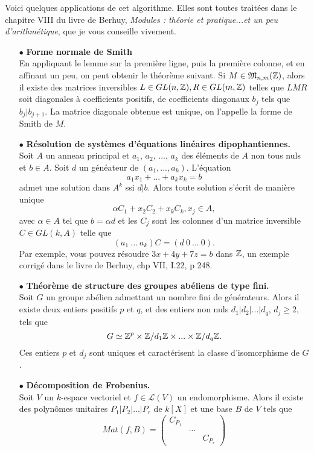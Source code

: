 Voici quelques applications de cet algorithme. Elles sont toutes traitées dans le chapitre VIII du livre de Berhuy, \textit{Modules : théorie et pratique...et un peu d'arithmétique}, que je vous conseille vivement.\\
\begin{itemize}
\item[$\bullet$] \textbf{Forme normale de Smith} \\ En appliquant le lemme sur la première ligne, puis la première colonne, et en affinant un peu, on peut obtenir le théorème suivant. Si $M\in \mathfrak M_{n,m}(\mathbb Z)$, alors il existe des matrices inversibles $L\in GL(n,\mathbb Z), R\in GL(m,\mathbb Z)$ telles que $LMR$ soit diagonales à coefficients positifs, de coefficients diagonaux $b_j$ tels que $b_j|b_{j+1}$. La matrice diagonale obtenue est unique, on l'appelle la forme de Smith de $M$.
\item[$\bullet$]\textbf{ Résolution de systèmes d'équations linéaires dipophantiennes.}\\ Soit $A$ un anneau principal et $a_1$, $a_2$, ..., $a_k$ des éléments de $A$ non tous nuls et $b\in A$. Soit $d$ un généateur de $(a_1,...,a_k)$. L'équation 
\[a_1 x_1 +...+a_k x_k = b\]
admet une solution dans $A^k$ ssi $d|b$. Alors toute solution s'écrit de manière unique
\[\alpha C_1 +x_2 C_2+ x_k C_k, x_j\in A,\]
avec $\alpha \in A$ tel que $b=\alpha d$ et les $C_j$ sont les colonnes d'un matrice inversible $C\in GL(k,A)$ telle que 
\[(a_1 \ ...\ a_k) C = (d\ 0\ ...\ 0).\]
Par exemple, vous pouvez résoudre $3x + 4y+7z =b$ dans $\mathbb Z$, un exemple corrigé dans le livre de Berhuy, chp VII, I.22, p 248.
\item[$\bullet$] \textbf{Théorème de structure des groupes abéliens de type fini.}\\ Soit $G$ un groupe abélien admettant un nombre fini de générateurs. Alors il existe deux entiers positifs $p$ et $q$, et des entiers non nuls $d_1|d_2|...|d_q$, $d_j\geq 2$, tels que 
\[G\simeq \mathbb Z^p\times \mathbb Z/d_1\mathbb Z \times ...\times \mathbb Z/d_q\mathbb Z.\]
Ces entiers $p$ et $d_j$ sont uniques et caractérisent la classe d'isomorphisme de $G$.
\item[$\bullet$] \textbf{Décomposition de Frobenius.} \\ Soit $V$ un $k$-espace vectoriel et $f\in \mathcal L(V)$ un endomorphisme. Alors il existe des polynômes unitaires $P_1|P_2|...|P_r$ de $k[X]$ et une base $B$ de $V$ tels que
\[Mat(f,B)=\begin{pmatrix}C_{P_1} & & \\
& ... & \\ & & C_{P_r} \end{pmatrix}\]

\end{itemize}
